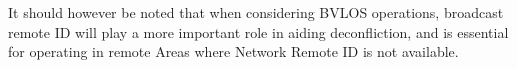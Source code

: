 \documentclass{ua_wgs_base}
\begin{document}
It should however be noted that when considering BVLOS operations,
broadcast remote ID will play a more important role in aiding deconfliction,
and is essential for operating in remote Areas where Network Remote
ID is not available.

\begin{figure}[p]
\begin{centering}
\\
\\

\end{centering}
\end{figure}
\end{document}
